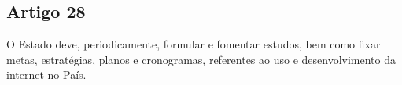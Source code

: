 \subsection{Artigo 28}
O Estado deve, periodicamente, formular e fomentar estudos, bem como fixar metas, estratégias, planos e cronogramas, referentes ao uso e desenvolvimento da internet no País.